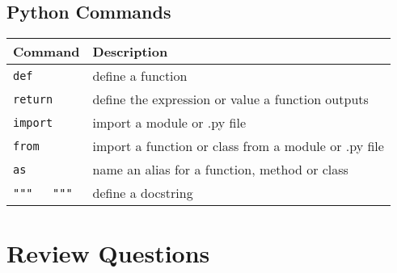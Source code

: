 \documentclass{book}
\newcommand{\passthrough}[1]{#1}
\begin{document}
    




    
        \hypertarget{python-commands}{%
\subsection{Python Commands}\label{python-commands}}

\begin{longtable}[]{@{}ll@{}}
\toprule
Command & Description\tabularnewline
\midrule
\endhead
\passthrough{\lstinline!def!} & define a function\tabularnewline
\passthrough{\lstinline!return!} & define the expression or value a
function outputs\tabularnewline
\passthrough{\lstinline!import!} & import a module or .py
file\tabularnewline
\passthrough{\lstinline!from!} & import a function or class from a
module or .py file\tabularnewline
\passthrough{\lstinline!as!} & name an alias for a function, method or
class\tabularnewline
\passthrough{\lstinline!"""   """!} & define a docstring\tabularnewline
\bottomrule
\end{longtable}
    




    
        \hypertarget{review-questions}{%
\section{Review Questions}\label{review-questions}}
    
\end{document}
